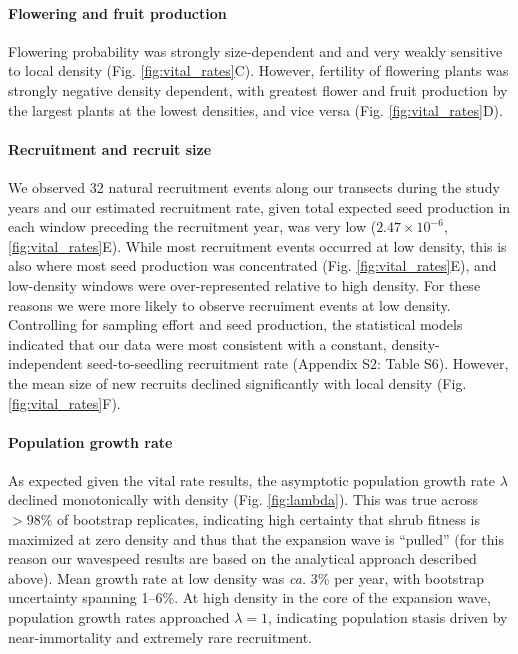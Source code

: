 \documentclass[11pt]{article}\usepackage[]{graphicx}\usepackage[usenames,dvipsnames]{xcolor}
\begin{document}
\paragraph{Flowering and fruit production}
Flowering probability was strongly size-dependent and and very weakly sensitive to local density (Fig. \ref{fig:vital_rates}C). 
However, fertility of flowering plants was strongly negative density dependent, with greatest flower and fruit production by the largest plants at the lowest densities, and vice versa (Fig. \ref{fig:vital_rates}D).

\paragraph{Recruitment and recruit size}
We observed 32 natural recruitment events along our transects during the study years and our estimated recruitment rate, given total expected seed production in each window preceding the recruitment year, was very low ($2.47 \times 10^{-6}$, \ref{fig:vital_rates}E). 
While most recruitment events occurred at low density, this is also where most seed production was concentrated (Fig. \ref{fig:vital_rates}E), and low-density windows were over-represented relative to high density. 
For these reasons we were more likely to observe recruiment events at low density. 
Controlling for sampling effort and seed production, the statistical models indicated that our data were most consistent with a constant, density-independent seed-to-seedling recruitment rate (Appendix S2: Table S6). 
However, the mean size of new recruits declined significantly with local density (Fig. \ref{fig:vital_rates}F).


\paragraph{Population growth rate}
As expected given the vital rate results, the asymptotic population growth rate $\lambda$ declined monotonically with density (Fig. \ref{fig:lambda}). 
This was true across $>98\%$ of bootstrap replicates, indicating high certainty that shrub fitness is maximized at zero density and thus that the expansion wave is ``pulled'' (for this reason our wavespeed results are based on the analytical approach described above). 
Mean growth rate at low density was \textit{ca.} 3\% per year, with bootstrap uncertainty spanning 1--6\%.
At high density in the core of the expansion wave, population growth rates approached $\lambda=1$, indicating population stasis driven by near-immortality and extremely rare recruitment. 
\end{document}
